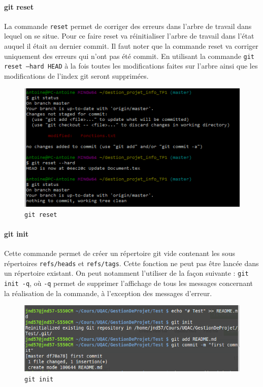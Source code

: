 \documentclass[11pt,canadien]{article}
\begin{document}
\paragraph{git reset}La commande \texttt{reset} permet de corriger des erreurs dans l'arbre de travail dans lequel on se situe. Pour ce faire reset va réinitialiser l'arbre de travail dans l'état auquel il était au dernier commit. Il faut noter que la commande reset va corriger uniquement des erreurs qui n'ont pas été commit. En utilisant la commande \texttt{git reset --hard HEAD} à la fois toutes les modifications faites sur l'arbre ainsi que les modifications de l'index git seront supprimées.
\begin{figure}[h]
	\centering
	\includegraphics{images/git_reset.png}
	\caption{\texttt{git reset}}
	\label{fig:git_reset}
\end{figure}

\paragraph{git init}Cette commande permet de créer un répertoire git vide contenant les sous répertoires \texttt{refs/heads} et \texttt{refs/tags}. Cette fonction ne peut pas être lancée dans un répertoire existant. On peut notamment l’utiliser de la façon suivante : \texttt{git init -q}, où \texttt{-q} permet de supprimer l’affichage de tous les messages concernant la réalisation de la commande, à l’exception des messages d’erreur.
\begin{figure}[h]
	\centering
	\includegraphics[width=\textwidth]{images/git-init.png}
	\caption{\texttt{git init}}
	\label{fig:git_init}
\end{figure}
\end{document}
